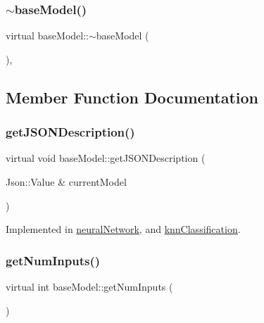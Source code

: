 \subsubsection{\texorpdfstring{$\sim$base\+Model()}{~baseModel()}}
{\footnotesize\ttfamily virtual base\+Model\+::$\sim$base\+Model (\begin{DoxyParamCaption}{ }\end{DoxyParamCaption})\hspace{0.3cm}{\ttfamily [inline]}, {\ttfamily [virtual]}}



\subsection{Member Function Documentation}
\mbox{\label{classbase_model_a54c7ba2132721c2f990ea2fe2313f863}} 
\subsubsection{\texorpdfstring{get\+J\+S\+O\+N\+Description()}{getJSONDescription()}}
{\footnotesize\ttfamily virtual void base\+Model\+::get\+J\+S\+O\+N\+Description (\begin{DoxyParamCaption}\item[{Json\+::\+Value \&}]{current\+Model }\end{DoxyParamCaption})\hspace{0.3cm}{\ttfamily [pure virtual]}}



Implemented in \hyperlink{classneural_network_a83f5c57ed3f555cd534a6f4ea425dfb7}{neural\+Network}, and \hyperlink{classknn_classification_a456b4b1b0fedb8f8fbe6d810bd80ceb8}{knn\+Classification}.

\mbox{\label{classbase_model_a1601088280ebe5be525fd1fe49d4b1e1}} 
\subsubsection{\texorpdfstring{get\+Num\+Inputs()}{getNumInputs()}}
{\footnotesize\ttfamily virtual int base\+Model\+::get\+Num\+Inputs (\begin{DoxyParamCaption}{ }\end{DoxyParamCaption})\hspace{0.3cm}{\ttfamily [pure virtual]}}




